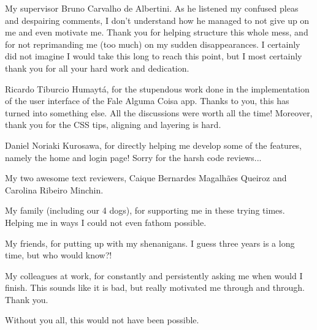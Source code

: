\documentclass[
	12pt,				%
	openright,			%
	oneside,			%
	a4paper,			%
	hyphens,			%
	english,			%
	english				%
]{abntex2}
\begin{document}

	\frenchspacing

	\pretextual

	\imprimircapa

	\imprimirfolhaderosto*
	
    \dedicatoria{
    
    }
    
    
    \begin{agradecimentos}
    My supervisor Bruno Carvalho de Albertini. As he listened my confused pleas and despairing comments, I don't understand how he managed to not give up on me and even motivate me. Thank you for helping structure this whole mess, and for not reprimanding me (too much) on my sudden disappearances. I certainly did not imagine I would take this long to reach this point, but I most certainly thank you for all your hard work and dedication.

    Ricardo Tiburcio Humaytá, for the stupendous work done in the implementation of the user interface of the Fale Alguma Coisa app. Thanks to you, this has turned into something else. All the discussions were worth all the time! Moreover, thank you for the CSS tips, aligning and layering is hard.
    
    Daniel Noriaki Kurosawa, for directly helping me develop some of the features, namely the home and login page! Sorry for the harsh code reviews...
    
    My two awesome text reviewers, Caique Bernardes Magalhães Queiroz and Carolina Ribeiro Minchin.

    My family (including our 4 dogs), for supporting me in these trying times. Helping me in ways I could not even fathom possible.
    
    My friends, for putting up with my shenanigans. I guess three years is a long time, but who would know?!
    
    My colleagues at work, for constantly and persistently asking me when would I finish. This sounds like it is bad, but really motivated me through and through. Thank you.

    Without you all, this would not have been possible.
    \end{agradecimentos}
    
\end{document}
